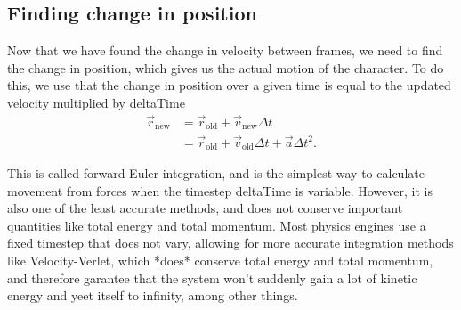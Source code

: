 \documentclass[%
notitlepage,
 amsmath,amssymb,
 aps,
]{revtex4-2}  %
\begin{document}
\subsection{Finding change in position}
Now that we have found the change in velocity between frames, we need to find the change in position, which gives us the actual motion of the character. To do this, we use that the change in position over a given time is equal to the updated velocity multiplied by deltaTime
\begin{align*}
    \vec{r}_{\text{new}} &= \vec{r}_{\text{old}} + \vec{v}_{\text{new}}\Delta t \\
                         &= \vec{r}_{\text{old}} + \vec{v}_{\text{old}}\Delta t + \vec{a}\Delta t^{2}.
\end{align*}

This is called forward Euler integration, and is the simplest way to calculate movement from forces when the timestep deltaTime is variable. However, it is also one of the least accurate methods, and does not conserve important quantities like total energy and total momentum. Most physics engines use a fixed timestep that does not vary, allowing for more accurate integration methods like Velocity-Verlet, which *does* conserve total energy and total momentum, and therefore garantee that the system won't suddenly gain a lot of kinetic energy and yeet itself to infinity, among other things.
\end{document}
